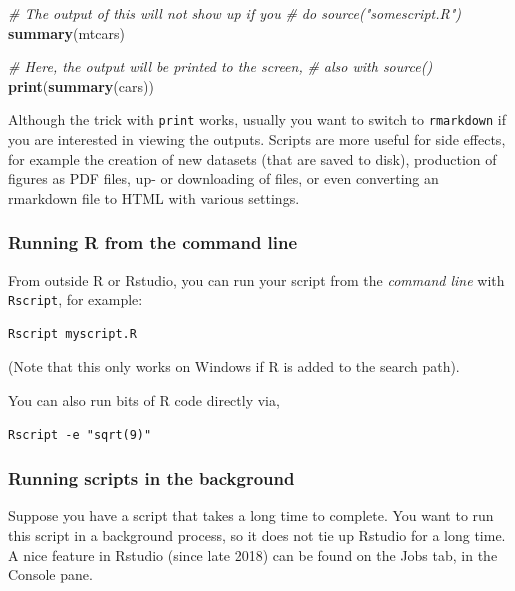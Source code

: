 \documentclass[]{book}
\newenvironment{Shaded}{\begin{snugshade}}{\end{snugshade}}
\newcommand{\CommentTok}[1]{\textcolor[rgb]{0.56,0.35,0.01}{\textit{#1}}}
\newcommand{\KeywordTok}[1]{\textcolor[rgb]{0.13,0.29,0.53}{\textbf{#1}}}
\newcommand{\NormalTok}[1]{#1}
\begin{document}
\begin{Shaded}
\begin{Highlighting}[]
\CommentTok{# The output of this will not show up if you }
\CommentTok{# do source("somescript.R")}
\KeywordTok{summary}\NormalTok{(mtcars)}

\CommentTok{# Here, the output will be printed to the screen,}
\CommentTok{# also with source()}
\KeywordTok{print}\NormalTok{(}\KeywordTok{summary}\NormalTok{(cars))}
\end{Highlighting}
\end{Shaded}

Although the trick with \texttt{print} works, usually you want to switch to \texttt{rmarkdown} if you are interested in viewing the outputs. Scripts are more useful for side effects, for example the creation of new datasets (that are saved to disk), production of figures as PDF files, up- or downloading of files, or even converting an rmarkdown file to HTML with various settings.

\hypertarget{running-r-from-the-command-line}{%
\subsubsection{Running R from the command line}\label{running-r-from-the-command-line}}

From outside R or Rstudio, you can run your script from the \emph{command line} with \texttt{Rscript}, for example:

\begin{verbatim}
Rscript myscript.R
\end{verbatim}

(Note that this only works on Windows if R is added to the search path).

You can also run bits of R code directly via,

\begin{verbatim}
Rscript -e "sqrt(9)"
\end{verbatim}

\hypertarget{running-scripts-in-the-background}{%
\subsubsection{Running scripts in the background}\label{running-scripts-in-the-background}}

Suppose you have a script that takes a long time to complete. You want to run this script in a background process, so it does not tie up Rstudio for a long time. A nice feature in Rstudio (since late 2018) can be found on the Jobs tab, in the Console pane.
\end{document}
